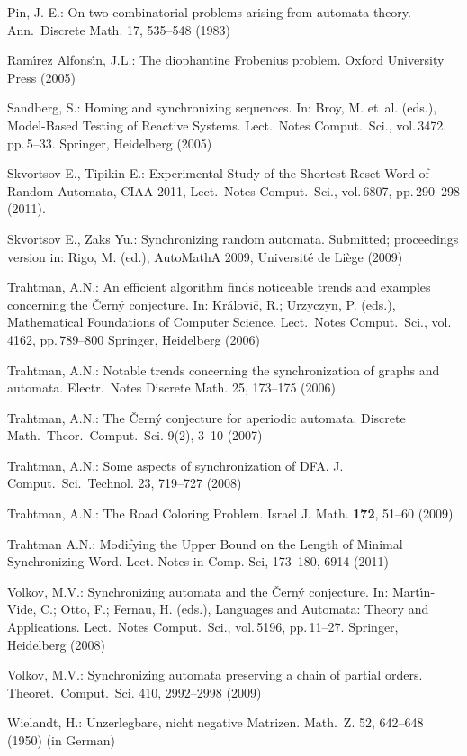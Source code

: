 \documentclass[11pt]{article}
\begin{document}
\begin{thebibliography}{99}
Pin, J.-E.: On two combinatorial problems arising from automata
theory. Ann.\ Discrete Math. 17, 535--548 (1983)

Ram\'{\i}rez Alfons\'{\i}n, J.L.: The diophantine Frobenius problem.
Oxford University Press (2005)

Sandberg, S.: Homing and synchronizing sequences. In: Broy, M.
et~al. (eds.), Model-Based Testing of Reactive Systems. Lect.\
Notes Comput.\ Sci., vol.\,3472, pp.\,5--33. Springer, Heidelberg
(2005)

Skvortsov E., Tipikin E.: Experimental Study of the Shortest 
Reset Word of Random Automata, CIAA 2011, Lect.\
Notes Comput.\ Sci., vol.\,6807, pp.\,290--298 (2011).

Skvortsov E., Zaks Yu.: Synchronizing random automata. Submitted;
proceedings version in: Rigo, M. (ed.), AutoMathA 2009, Universit\'e
de Li\`ege (2009)

Trahtman, A.N.: An efficient algorithm finds noticeable trends
and examples concerning the \v{C}ern\'y conjecture. In:
Kr\'alovi\v{c}, R.; Urzyczyn, P. (eds.), Mathematical Foundations
of Computer Science. Lect.\ Notes Comput.\ Sci., vol.\,4162, pp.\,789--800
Springer, Heidelberg (2006)

Trahtman, A.N.: Notable trends concerning the synchronization
of graphs and automata. Electr.\ Notes Discrete Math. 25, 173--175 (2006)

\bibitem{Tr07}
Trahtman, A.N.: The \v{C}ern\'y conjecture for aperiodic automata.
Discrete Math.\ Theor.\ Comput.\ Sci. 9(2), 3--10 (2007)

Trahtman, A.N.: Some aspects of synchronization of DFA. J. Comput.\ Sci.\
Technol. 23, 719--727 (2008)

\bibitem{Tr09}
Trahtman, A.N.: The Road Coloring Problem. Israel J. Math.
\textbf{172}, 51--60 (2009)

\bibitem{Tr11}
Trahtman A.N.: Modifying the Upper Bound on the Length of Minimal Synchronizing
Word. Lect. Notes in Comp. Sci, 173--180, 6914 (2011)

\bibitem{Vo08}
Volkov, M.V.: Synchronizing automata and the \v{C}ern\'{y}
conjecture. In: Mart\'\i{}n-Vide, C.; Otto, F.; Fernau, H. (eds.),
Languages and Automata: Theory and Applications. Lect.\ Notes
Comput.\ Sci., vol.\,5196, pp.\,11--27.  Springer, Heidelberg (2008)

\bibitem{Vo09}
Volkov, M.V.: Synchronizing automata preserving a chain of partial
orders. Theoret.\ Comput.\ Sci. 410, 2992--2998 (2009)

\bibitem{Wi50}
Wielandt, H.: Unzerlegbare, nicht negative Matrizen. Math.\ Z.
52, 642--648 (1950) (in German)
\end{thebibliography}
\end{document}

